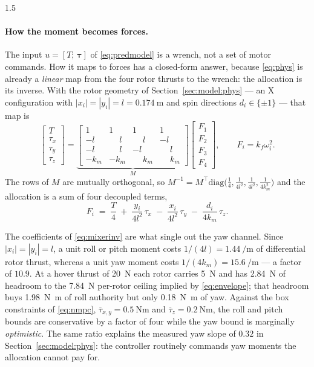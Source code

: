 \begin{spacing}{1.5}
\paragraph{How the moment becomes forces.} The input $u = [T;\,\bm\tau]$ of
\eqref{eq:predmodel} is a wrench, not a set of motor commands. How it maps to
forces has a closed-form answer, because \eqref{eq:phys} is already a
\emph{linear} map from the four rotor thrusts to the wrench: the allocation is
its inverse. With the rotor geometry of Section~\ref{sec:model:phys} --- an X
configuration with $|x_i| = |y_i| = l = \SI{0.174}{\meter}$ and spin directions
$d_i \in \{\pm 1\}$ --- that map is
\begin{equation}
\begin{bmatrix} T \\ \tau_x \\ \tau_y \\ \tau_z \end{bmatrix}
=
\underbrace{
\begin{bmatrix}
1 & 1 & 1 & 1 \\
-l & \phantom{-}l & \phantom{-}l & -l \\
-l & \phantom{-}l & -l & \phantom{-}l \\
-k_m & -k_m & \phantom{-}k_m & \phantom{-}k_m
\end{bmatrix}}_{M}
\begin{bmatrix} F_1 \\ F_2 \\ F_3 \\ F_4 \end{bmatrix},
\qquad F_i = k_f \omega_i^2 .
\label{eq:mixer}
\end{equation}
The rows of $M$ are mutually orthogonal, so
$M^{-1} = M^{\!\top}\mathrm{diag}\bigl(\tfrac{1}{4}, \tfrac{1}{4l^2},
\tfrac{1}{4l^2}, \tfrac{1}{4k_m^2}\bigr)$ and the allocation is a sum of four
decoupled terms,
\begin{equation}
F_i \;=\; \frac{T}{4}
 \;+\; \frac{y_i}{4l^2}\,\tau_x
 \;-\; \frac{x_i}{4l^2}\,\tau_y
 \;-\; \frac{d_i}{4k_m}\,\tau_z .
\label{eq:mixerinv}
\end{equation}

The coefficients of \eqref{eq:mixerinv} are what single out the yaw channel.
Since $|x_i| = |y_i| = l$, a unit roll or pitch moment costs
$1/(4l) = \SI{1.44}{\per\meter}$ of differential rotor thrust, whereas a unit yaw
moment costs $1/(4k_m) = \SI{15.6}{\per\meter}$ --- a factor of $10.9$. At a
hover thrust of \SI{20}{\newton} each rotor carries \SI{5}{\newton} and has
\SI{2.84}{\newton} of headroom to the \SI{7.84}{\newton} per-rotor ceiling
implied by \eqref{eq:envelope}; that headroom buys \SI{1.98}{\newton\meter} of
roll authority but only \SI{0.18}{\newton\meter} of yaw. Against the box
constraints of \eqref{eq:nmpc}, $\overline\tau_{x,y} = \SI{0.5}{\newton\meter}$
and $\overline\tau_z = \SI{0.2}{\newton\meter}$, the roll and pitch bounds are
conservative by a factor of four while the yaw bound is marginally
\emph{optimistic}. The same ratio explains the measured yaw slope of $0.32$ in
Section~\ref{sec:model:phys}: the controller routinely commands yaw moments the
allocation cannot pay for.


\end{spacing}
